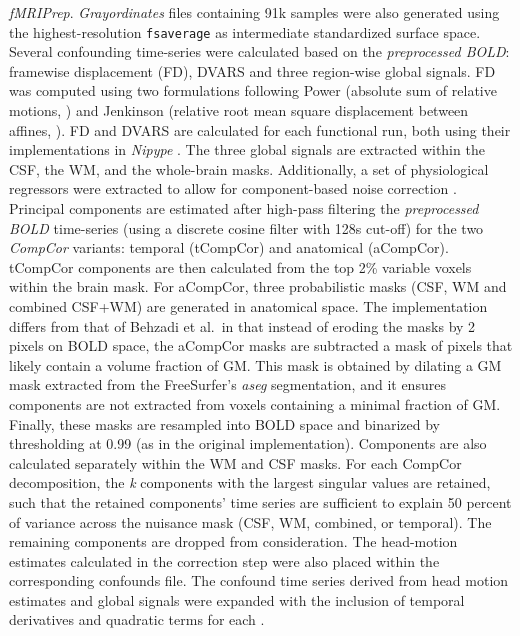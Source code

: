 \documentclass[]{article}
\begin{document}
\begin{description}
\emph{fMRIPrep}. \emph{Grayordinates} files \citep{hcppipelines}
containing 91k samples were also generated using the highest-resolution
\texttt{fsaverage} as intermediate standardized surface space. Several
confounding time-series were calculated based on the \emph{preprocessed
BOLD}: framewise displacement (FD), DVARS and three region-wise global
signals. FD was computed using two formulations following Power
(absolute sum of relative motions, \citet{power_fd_dvars}) and Jenkinson
(relative root mean square displacement between affines,
\citet{mcflirt}). FD and DVARS are calculated for each functional run,
both using their implementations in \emph{Nipype} \citep[following the
definitions by][]{power_fd_dvars}. The three global signals are
extracted within the CSF, the WM, and the whole-brain masks.
Additionally, a set of physiological regressors were extracted to allow
for component-based noise correction \citep[\emph{CompCor},][]{compcor}.
Principal components are estimated after high-pass filtering the
\emph{preprocessed BOLD} time-series (using a discrete cosine filter
with 128s cut-off) for the two \emph{CompCor} variants: temporal
(tCompCor) and anatomical (aCompCor). tCompCor components are then
calculated from the top 2\% variable voxels within the brain mask. For
aCompCor, three probabilistic masks (CSF, WM and combined CSF+WM) are
generated in anatomical space. The implementation differs from that of
Behzadi et al.~in that instead of eroding the masks by 2 pixels on BOLD
space, the aCompCor masks are subtracted a mask of pixels that likely
contain a volume fraction of GM. This mask is obtained by dilating a GM
mask extracted from the FreeSurfer's \emph{aseg} segmentation, and it
ensures components are not extracted from voxels containing a minimal
fraction of GM. Finally, these masks are resampled into BOLD space and
binarized by thresholding at 0.99 (as in the original implementation).
Components are also calculated separately within the WM and CSF masks.
For each CompCor decomposition, the \emph{k} components with the largest
singular values are retained, such that the retained components' time
series are sufficient to explain 50 percent of variance across the
nuisance mask (CSF, WM, combined, or temporal). The remaining components
are dropped from consideration. The head-motion estimates calculated in
the correction step were also placed within the corresponding confounds
file. The confound time series derived from head motion estimates and
global signals were expanded with the inclusion of temporal derivatives
and quadratic terms for each \citep{confounds_satterthwaite_2013}.

\end{description}
\end{document}
